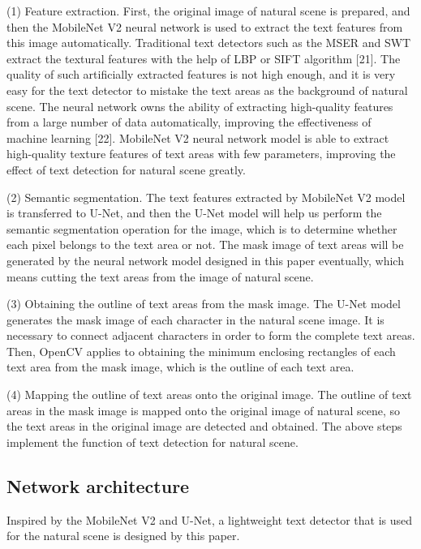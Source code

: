 \documentclass[22pt, UTF8]{article}
\numberwithin{figure}{section}
\numberwithin{table}{section}
\numberwithin{equation}{section} %
\begin{document}
\setlength\parindent{2em} (1) Feature extraction. First, the original image of natural scene is prepared, and then the MobileNet V2 neural network is used to extract the text features from this image automatically. Traditional text detectors such as the MSER and SWT extract the textural features with the help of LBP or SIFT algorithm [21]. The quality of such artificially extracted features is not high enough, and it is very easy for the text detector to mistake the text areas as the background of natural scene. The neural network owns the ability of extracting high-quality features from a large number of data automatically, improving the effectiveness of machine learning [22]. MobileNet V2 neural network model is able to extract high-quality texture features of text areas with few parameters, improving the effect of text detection for natural scene greatly.

\setlength\parindent{2em} (2) Semantic segmentation. The text features extracted by MobileNet V2 model is transferred to U-Net, and then the U-Net model will help us perform the semantic segmentation operation for the image, which is to determine whether each pixel belongs to the text area or not. The mask image of text areas will be generated by the neural network model designed in this paper eventually, which means cutting the text areas from the image of natural scene.

\setlength\parindent{2em} (3) Obtaining the outline of text areas from the mask image. The U-Net model generates the mask image of each character in the natural scene image. It is necessary to connect adjacent characters in order to form the complete text areas. Then, OpenCV applies to obtaining the minimum enclosing rectangles of each text area from the mask image, which is the outline of each text area.

\setlength\parindent{2em} (4) Mapping the outline of text areas onto the original image. The outline of text areas in the mask image is mapped onto the original image of natural scene, so the text areas in the original image are detected and obtained. The above steps implement the function of text detection for natural scene.

\subsection{Network architecture}

\setlength\parindent{2em} Inspired by the MobileNet V2 and U-Net, a lightweight text detector that is used for the natural scene is designed by this paper.
\end{document}
